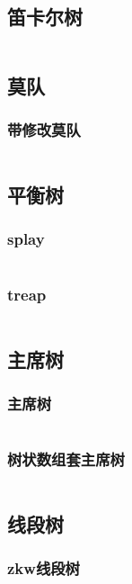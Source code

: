 \documentclass{article}
\begin{document}
\subsection{笛卡尔树}
\inputminted[breaklines]{c++}{../数据结构/笛卡尔树.cpp}

\subsection{莫队}
\subsubsection{带修改莫队}
\inputminted[breaklines]{c++}{../数据结构/带修改莫队.cpp}

\subsection{平衡树}
\subsubsection{splay}
\inputminted[breaklines]{c++}{../数据结构/splay.cpp}

\subsubsection{treap}
\inputminted[breaklines]{c++}{../数据结构/treap.cpp}

\subsection{主席树}
\subsubsection{主席树}
\inputminted[breaklines]{c++}{../数据结构/主席树.cpp}

\subsubsection{树状数组套主席树}
\inputminted[breaklines]{c++}{../数据结构/bit套主席树.cpp}

\subsection{线段树}
\subsubsection{zkw线段树}
\inputminted[breaklines]{c++}{../数据结构/zkw.cpp}
\end{document}
